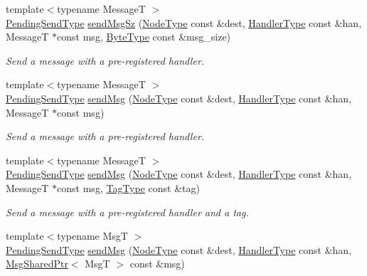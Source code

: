\begin{DoxyCompactItemize}
{\footnotesize template$<$typename MessageT $>$ }\\\hyperlink{structvt_1_1messaging_1_1_active_messenger_a3626a6ca76d8ad4ec7c3b47a2c70d3a8}{Pending\+Send\+Type} \hyperlink{group__preregister_gaaa9d337aea172f7ae94113da04d96128}{send\+Msg\+Sz} (\hyperlink{namespacevt_a866da9d0efc19c0a1ce79e9e492f47e2}{Node\+Type} const \&dest, \hyperlink{namespacevt_af64846b57dfcaf104da3ef6967917573}{Handler\+Type} const \&han, MessageT $\ast$const msg, \hyperlink{namespacevt_aab8d55968084610ce3b17057981e9300}{Byte\+Type} const \&msg\+\_\+size)
\begin{DoxyCompactList}\small\item\em Send a message with a pre-\/registered handler. \end{DoxyCompactList}\item 
{\footnotesize template$<$typename MessageT $>$ }\\\hyperlink{structvt_1_1messaging_1_1_active_messenger_a3626a6ca76d8ad4ec7c3b47a2c70d3a8}{Pending\+Send\+Type} \hyperlink{group__preregister_ga55c6ea91181ae20c681e73a356750916}{send\+Msg} (\hyperlink{namespacevt_a866da9d0efc19c0a1ce79e9e492f47e2}{Node\+Type} const \&dest, \hyperlink{namespacevt_af64846b57dfcaf104da3ef6967917573}{Handler\+Type} const \&han, MessageT $\ast$const msg)
\begin{DoxyCompactList}\small\item\em Send a message with a pre-\/registered handler. \end{DoxyCompactList}\item 
{\footnotesize template$<$typename MessageT $>$ }\\\hyperlink{structvt_1_1messaging_1_1_active_messenger_a3626a6ca76d8ad4ec7c3b47a2c70d3a8}{Pending\+Send\+Type} \hyperlink{group__preregister_ga93893f5f092a2444f652fd25f37eb7d0}{send\+Msg} (\hyperlink{namespacevt_a866da9d0efc19c0a1ce79e9e492f47e2}{Node\+Type} const \&dest, \hyperlink{namespacevt_af64846b57dfcaf104da3ef6967917573}{Handler\+Type} const \&han, MessageT $\ast$const msg, \hyperlink{namespacevt_a84ab281dae04a52a4b243d6bf62d0e52}{Tag\+Type} const \&tag)
\begin{DoxyCompactList}\small\item\em Send a message with a pre-\/registered handler and a tag. \end{DoxyCompactList}\item 
{\footnotesize template$<$typename MsgT $>$ }\\\hyperlink{structvt_1_1messaging_1_1_active_messenger_a3626a6ca76d8ad4ec7c3b47a2c70d3a8}{Pending\+Send\+Type} \hyperlink{group__preregister_ga78d906520ffe21829f5177f20fbc839d}{send\+Msg} (\hyperlink{namespacevt_a866da9d0efc19c0a1ce79e9e492f47e2}{Node\+Type} const \&dest, \hyperlink{namespacevt_af64846b57dfcaf104da3ef6967917573}{Handler\+Type} const \&han, \hyperlink{structvt_1_1messaging_1_1_msg_shared_ptr}{Msg\+Shared\+Ptr}$<$ MsgT $>$ const \&msg)

\end{DoxyCompactItemize}
